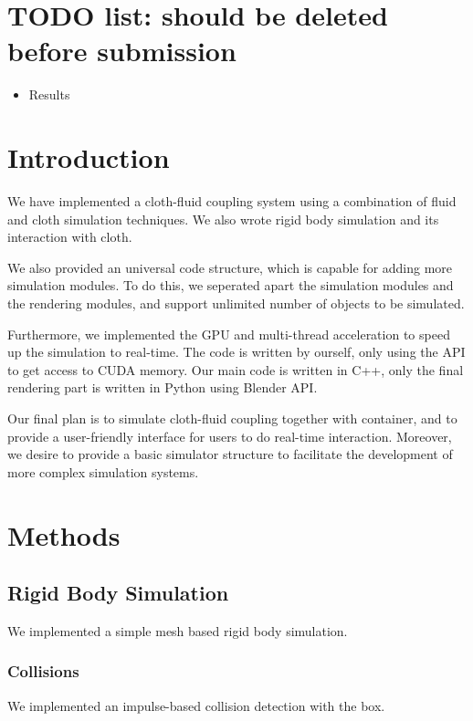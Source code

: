 \section{TODO list: should be deleted before submission}

\begin{itemize}
\item Results
\end{itemize}

\section{Introduction}

We have implemented a cloth-fluid coupling system using a combination of fluid and cloth simulation techniques. We also wrote rigid body simulation and its interaction with cloth. 

We also provided an universal code structure, which is capable for adding more simulation modules. To do this, we seperated apart the simulation modules and the rendering modules, and support unlimited number of objects to be simulated.

Furthermore, we implemented the GPU and multi-thread acceleration to speed up the simulation to real-time. The code is written by ourself, only using the API to get access to CUDA memory. Our main code is written in C++, only the final rendering part is written in Python using Blender API.

Our final plan is to simulate cloth-fluid coupling together with container, and to provide a user-friendly interface for users to do real-time interaction. Moreover, we desire to provide a basic simulator structure to facilitate the development of more complex simulation systems.
\section{Methods}

\subsection{Rigid Body Simulation}

We implemented a simple mesh based rigid body simulation. 

\subsubsection{Collisions}

We implemented an impulse-based collision detection with the box.

